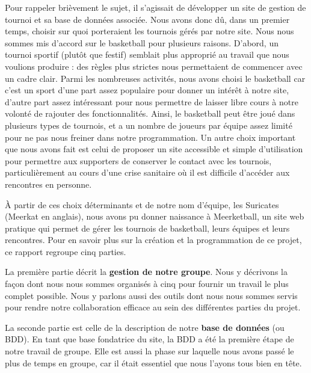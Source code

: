 \documentclass[12pt]{report}
\begin{document}
	    \bigskip
		\par
        Pour rappeler brièvement le sujet, il s’agissait de développer un site de gestion de tournoi et sa base de données associée. Nous avons donc dû, dans un premier temps, choisir sur quoi porteraient les tournois gérés par notre site. Nous nous sommes mis d’accord sur le basketball pour plusieurs raisons. D’abord, un tournoi sportif (plutôt que festif) semblait plus approprié au travail que nous voulions produire : des règles plus strictes nous permettaient de commencer avec un cadre clair. Parmi les nombreuses activités, nous avons choisi le basketball car c’est un sport d’une part assez populaire pour donner un intérêt à notre site, d’autre part assez intéressant pour nous permettre de laisser libre cours à notre volonté de rajouter des fonctionnalités. Ainsi, le basketball peut être joué dans plusieurs types de tournois, et a un nombre de joueurs par équipe assez limité pour ne pas nous freiner dans notre programmation. Un autre choix important que nous avons fait est celui de proposer un site accessible et simple d’utilisation pour permettre aux supporters de conserver le contact avec les tournois, particulièrement au cours d’une crise sanitaire où il est difficile d’accéder aux rencontres en personne.
		    
	    \bigskip
	    \par
	    À partir de ces choix déterminants et de notre nom d’équipe, les Suricates (Meerkat en anglais), nous avons pu donner naissance à Meerketball, un site web pratique qui permet de gérer les tournois de basketball, leurs équipes et leurs rencontres. Pour en savoir plus sur la création et la programmation de ce projet, ce rapport regroupe cinq parties.
		    
	    \bigskip
	    \par
	    La première partie décrit la \textbf{gestion de notre groupe}. Nous y décrivons la façon dont nous nous sommes organisés à cinq pour fournir un travail le plus complet possible. Nous y parlons aussi des outils dont nous nous sommes servis pour rendre notre collaboration efficace au sein des différentes parties du projet.
		    
	    \bigskip
	    \par
	    La seconde partie est celle de la description de notre \textbf{base de données} (ou BDD). En tant que base fondatrice du site, la BDD a été la première étape de notre travail de groupe. Elle est aussi la phase sur laquelle nous avons passé le plus de temps en groupe, car il était essentiel que nous l’ayons tous bien en tête.
		    
\end{document}
